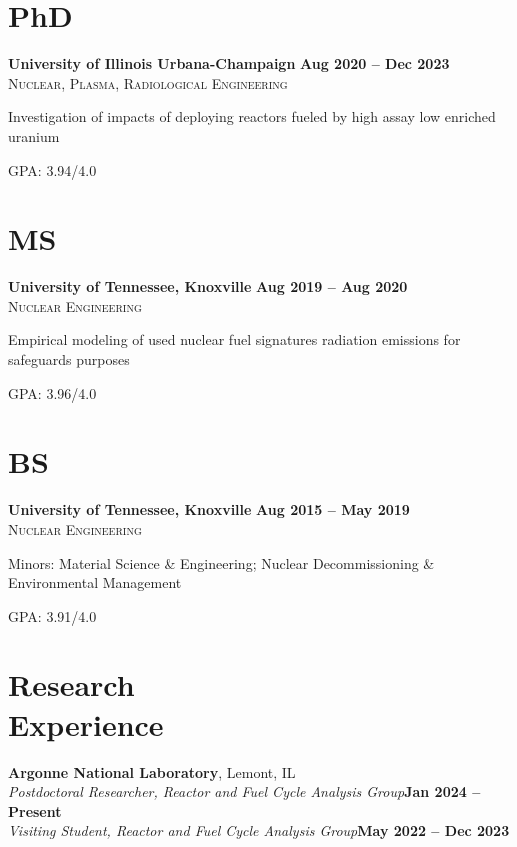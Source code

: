 \documentclass[margin,line]{resume}
\begin{document}
\begin{resume}
    \section{\mysidestyle PhD}
    \textbf{University of Illinois Urbana-Champaign} \hfill \textbf{Aug 2020 -- Dec 2023}\\%
    \textsc{Nuclear, Plasma, Radiological Engineering}\hfill
    \begin{list2}
        \item Investigation of impacts of deploying reactors fueled by high 
        assay low enriched uranium
        \item GPA: 3.94/4.0
    \end{list2}\vspace{-4mm}
    
    \section{\mysidestyle MS}
    \textbf{University of Tennessee, Knoxville} \hfill\textbf{Aug 2019 -- Aug 2020}\\%
    \textsc{Nuclear Engineering}\hfill
    \begin{list2}
        \item Empirical modeling of used nuclear fuel signatures radiation emissions for safeguards purposes
        \item GPA: 3.96/4.0
    \end{list2}\vspace{-4mm}
    \section{\mysidestyle BS}
    \textbf{University of Tennessee, Knoxville} \hfill\textbf{Aug 2015 -- May 2019}\\%
    \textsc{Nuclear Engineering}\hfill
    \begin{list2}
        \item Minors: Material Science \& Engineering; Nuclear Decommissioning \& 
              Environmental Management
        \item GPA: 3.91/4.0
    \end{list2}\vspace{-5mm}
    
    \section{\mysidestyle Research\\Experience}
    \textbf{Argonne National Laboratory}, Lemont, IL\\
    \vspace{0mm}
        \textsl{Postdoctoral Researcher, Reactor and Fuel Cycle Analysis Group}\hfill\textbf{Jan 2024 -- Present}\\\vspace{-2mm}
        \textsl{Visiting Student, Reactor and Fuel Cycle Analysis Group}\hfill\textbf{May 2022 -- Dec 2023}\\\vspace{-6mm}


\end{resume}
\end{document}
